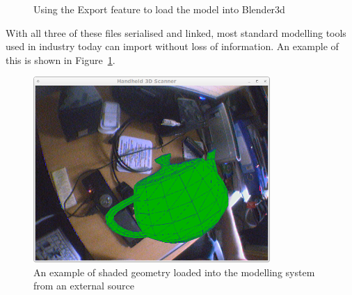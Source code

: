 \documentclass[a4paper,10pt]{article}
\begin{document}
\begin{itemize}
{\begin{figure}
  \begin{center}
  \end{center}
  \caption{Using the Export feature to load the model into Blender3d}
  \label{blender}
\end{figure}

With all three of these files serialised and linked, most standard modelling tools used in industry today can import without loss of information. An example of this is shown in Figure~\ref{blender}.}

\begin{figure}
  \begin{center}
    \includegraphics[width=340px]{Teapot}
  \end{center}
  \caption{An example of shaded geometry loaded into the modelling system from an external source}
  \label{load}
\end{figure}


\end{itemize}
\end{document}
